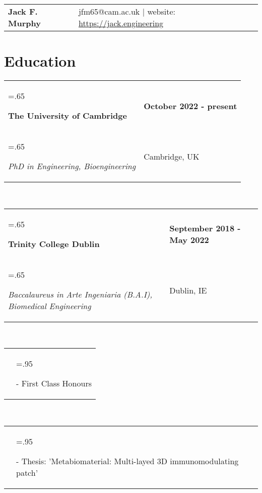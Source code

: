 \documentclass[letterpaper,11pt]{article}
\newcommand{\itemHeadings}[4]{
    \begin{tabularx}{\textwidth} {>{\hsize=.65\textwidth\raggedright\arraybackslash}X 
   >{\raggedleft\arraybackslash}X}
      #1 & \small#2 \\
      #3 & \small#4
    \end{tabularx}
    \\
}
\newcommand{\itemitems}[1]{
    \begin{tabularx}{\textwidth} {>{\raggedleft\arraybackslash}X >{\hsize=.95\textwidth\raggedright\arraybackslash}X}
      &- \small#1 \\
    \end{tabularx}
    \\
}
\newcommand{\heading}[3]{
    \hspace{-15mm}
    \begin{tabular}{p{.4\textwidth} >{\raggedleft}p{.57\textwidth}}
        \textbf{\Huge{#1}}\vspace{5mm} & #2 $|$ #3 \\
    \end{tabular}
}
\newcommand{\sect}[1]{
    \vspace{-.4em}
    \section*{#1}
    \vspace{-3.5mm}
}
\begin{document}
\heading
    {Jack F. Murphy}
    {jfm65@cam.ac.uk}
    {website: \href{https://jack.engineering}{https://jack.engineering}}

\noindent
\vspace{0cm}

\sect{Education}
    \itemHeadings
        {\textbf{The University of Cambridge}}
        {\textbf{October 2022 - present}}
        {\hspace{5pt}\emph{PhD in Engineering, Bioengineering}}
        {Cambridge, UK}
    \itemHeadings
        {\textbf{Trinity College Dublin}}
        {\textbf{September 2018 - May 2022}}
        {\hspace{5pt}\emph{Baccalaureus in Arte Ingeniaria (B.A.I), Biomedical Engineering}}
        {Dublin, IE}
        \itemitems
            {First Class Honours}
        \itemitems
            {Thesis: 'Metabiomaterial: Multi-layed 3D immunomodulating patch'}

\end{document}
